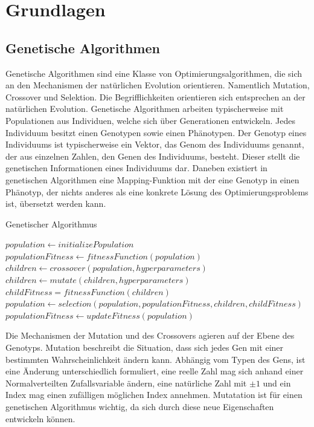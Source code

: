 \section{Grundlagen}
\label{sub:grundlagen}
\subsection{Genetische Algorithmen}

Genetische Algorithmen sind eine Klasse von Optimierungsalgorithmen, die sich an den Mechanismen der natürlichen Evolution orientieren\cite{Simon.2013}.
Namentlich Mutation, Crossover und Selektion.
Die Begrifflichkeiten orientieren sich entsprechen an der natürlichen Evolution.
Genetische Algorithmen arbeiten typischerweise mit Populationen aus Individuen, welche sich über Generationen entwickeln.
Jedes Individuum besitzt einen Genotypen sowie einen Phänotypen.
Der Genotyp eines Individuums ist typischerweise ein Vektor, das Genom des Individuums genannt, der aus einzelnen Zahlen, den Genen des Individuums, besteht. Dieser stellt die genetischen Informationen eines Individuums dar. Daneben existiert in genetischen Algorithmen eine Mapping-Funktion mit der eine Genotyp in einen Phänotyp, der nichts anderes als eine konkrete Lösung des Optimierungsproblems ist, übersetzt werden kann.

\begin{algorithm}
\caption{Genetischer Algorithmus} \label{alg:geneticAlgorihtm}
\begin{algorithmic}[1]
	\State $population \gets initializePopulation$
	\State $populationFitness \gets fitnessFunction(population)$
		\State $children \gets crossover(population,hyperparameters)$
		\State $children \gets mutate(children,hyperparameters)$
		\State $childFitness = fitnessFunction(children)$
		\State $population \gets selection(population,populationFitness,children,childFitness)$
		\State $populationFitness \gets updateFitness(population)$
	\EndFor
	\EndProcedure
\end{algorithmic}
\end{algorithm}

Die Mechanismen der Mutation und des Crossovers agieren auf der Ebene des Genotyps.
Mutation beschreibt die Situation, dass sich jedes Gen mit einer bestimmten Wahrscheinlichkeit ändern kann. 
Abhängig vom Typen des Gens, ist eine Änderung unterschiedlich formuliert, eine reelle Zahl mag sich anhand einer Normalverteilten Zufallsvariable ändern, eine natürliche Zahl mit $\pm1$ und ein Index mag einen zufälligen möglichen Index annehmen. 
Mutatation ist für einen genetischen Algorithmus wichtig, da sich durch diese neue Eigenschaften entwickeln können.

